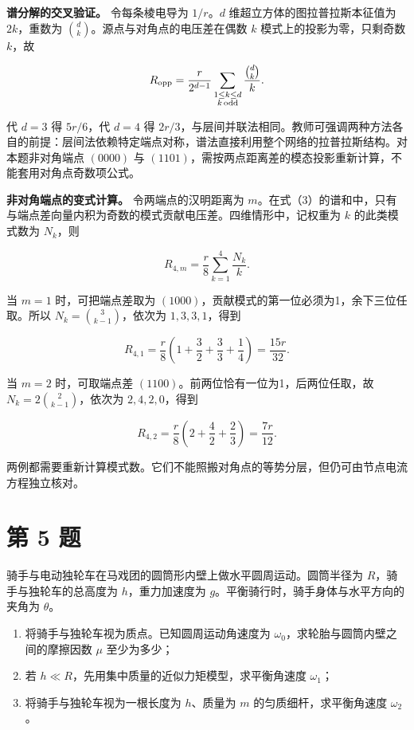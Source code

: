 \documentclass[12pt,a4paper,UTF8]{ctexart}
\newcommand{\tightlist}{\setlength{\itemsep}{0pt}\setlength{\parskip}{0pt}}
\begin{document}
\textbf{谱分解的交叉验证。} 令每条棱电导为 \(1/r\)。\(d\)
维超立方体的图拉普拉斯本征值为 \(2k\)，重数为
\(\binom dk\)。源点与对角点的电压差在偶数 \(k\)
模式上的投影为零，只剩奇数 \(k\)，故

\[
R_{\rm opp}=\frac{r}{2^{d-1}}\sum_{\substack{1\leq k\leq d\\ k\,\rm odd}}\frac{\binom dk}{k}.
\]

代 \(d=3\) 得 \(5r/6\)，代 \(d=4\) 得
\(2r/3\)，与层间并联法相同。教师可强调两种方法各自的前提：层间法依赖特定端点对称，谱法直接利用整个网络的拉普拉斯结构。对本题非对角端点
\((0000)\) 与
\((1101)\)，需按两点距离差的模态投影重新计算，不能套用对角点奇数项公式。

\textbf{非对角端点的变式计算。} 令两端点的汉明距离为
\(m\)。在式（3）的谱和中，只有与端点差向量内积为奇数的模式贡献电压差。四维情形中，记权重为
\(k\) 的此类模式数为 \(N_k\)，则

\[
R_{4,m}=\frac r8\sum_{k=1}^4\frac{N_k}{k}.
\]

当 \(m=1\) 时，可把端点差取为
\((1000)\)，贡献模式的第一位必须为1，余下三位任取。所以
\(N_k=\binom3{k-1}\)，依次为 \(1,3,3,1\)，得到

\[
R_{4,1}=\frac r8\left(1+\frac32+\frac33+\frac14\right)=\frac{15r}{32}.
\]

当 \(m=2\) 时，可取端点差 \((1100)\)。前两位恰有一位为1，后两位任取，故
\(N_k=2\binom2{k-1}\)，依次为 \(2,4,2,0\)，得到

\[
R_{4,2}=\frac r8\left(2+\frac42+\frac23\right)=\frac{7r}{12}.
\]

两例都需要重新计算模式数。它们不能照搬对角点的等势分层，但仍可由节点电流方程独立核对。

\newpage

\section{第 5 题}\label{ux7b2c-5-ux9898}

骑手与电动独轮车在马戏团的圆筒形内壁上做水平圆周运动。圆筒半径为
\(R\)，骑手与独轮车的总高度为 \(h\)，重力加速度为
\(g\)。平衡骑行时，骑手身体与水平方向的夹角为 \(\theta\)。

\begin{enumerate}
\def\labelenumi{\arabic{enumi}.}
\tightlist
\item
  将骑手与独轮车视为质点。已知圆周运动角速度为
  \(\omega_0\)，求轮胎与圆筒内壁之间的摩擦因数 \(\mu\) 至少为多少；
\item
  若 \(h\ll R\)，先用集中质量的近似力矩模型，求平衡角速度 \(\omega_1\)；
\item
  将骑手与独轮车视为一根长度为 \(h\)、质量为 \(m\)
  的匀质细杆，求平衡角速度 \(\omega_2\)。
\end{enumerate}
\end{document}
